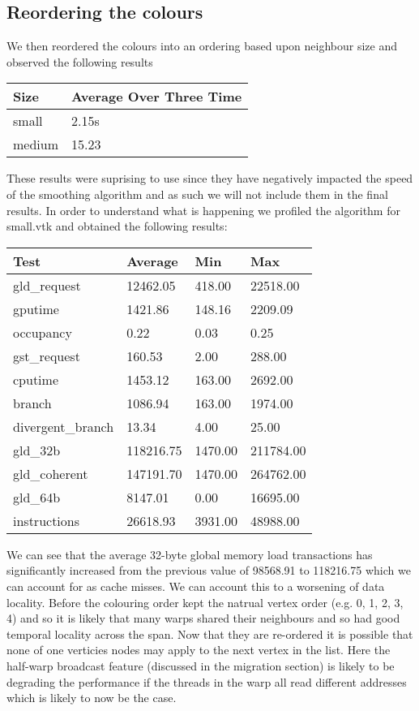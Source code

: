 \subsection*{Reordering the colours}
We then reordered the colours into an ordering based upon neighbour size and observed the following results\\
\begin{tabular}{ l | l }
  \hline
  Size & Average Over Three Time \\
  \hline
  \hline
  small & 2.15s \\
  medium & 15.23 \\
  \hline
\end{tabular}

These results were suprising to use since they have negatively impacted the speed of the smoothing algorithm and as such we will not include them in the final results. In order to understand what is happening we profiled the algorithm for small.vtk and obtained the following results:\\

\begin{tabular}{ l | l | l | l}
\hline
Test & Average & Min & Max \\
\hline
\hline
gld\_request & 12462.05 & 418.00 & 22518.00 \\
gputime & 1421.86 & 148.16 & 2209.09 \\
occupancy & 0.22 & 0.03 & 0.25 \\
gst\_request & 160.53 & 2.00 & 288.00 \\
cputime & 1453.12 & 163.00 & 2692.00 \\
branch & 1086.94 & 163.00 & 1974.00 \\
divergent\_branch & 13.34 & 4.00 & 25.00 \\
gld\_32b & 118216.75 & 1470.00 & 211784.00 \\
gld\_coherent & 147191.70 & 1470.00 & 264762.00 \\
gld\_64b & 8147.01 & 0.00 & 16695.00 \\
instructions & 26618.93 & 3931.00 & 48988.00 \\
\hline
\end{tabular}

We can see that the average 32-byte global memory load transactions has significantly increased from the previous value of 98568.91 to 118216.75 which we can account for as cache misses. We can account this to a worsening of data locality. Before the colouring order kept the natrual vertex order (e.g. 0, 1, 2, 3, 4) and so it is likely that many warps shared their neighbours and so had good temporal locality across the span.
Now that they are re-ordered it is possible that none of one verticies nodes may apply to the next vertex in the list.
Here the half-warp broadcast feature (discussed in the migration section) is likely to be degrading the performance if the
threads in the warp all read different addresses which is likely to now be the case.
